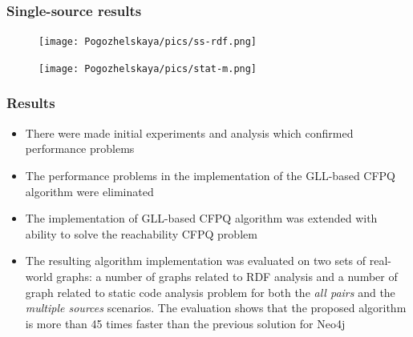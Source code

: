 \documentclass{beamer}
\begin{document}
\begin{frame} 
\transwipe[direction=90]
 \frametitle{Single-source results}
 \begin{figure}[H]
\centering
\texttt{[image: Pogozhelskaya/pics/ss-rdf.png]}
\label{fig:arch}
\end{figure}

\begin{figure}[H]
\centering
\texttt{[image: Pogozhelskaya/pics/stat-m.png]}
\label{fig:arch}
\end{figure}

\end{frame}

\begin{frame}
\transwipe[direction=90]
\frametitle{Results}
\begin{itemize}
     \item There were made initial experiments and analysis which confirmed performance problems
    \item The performance problems in the implementation of the GLL-based CFPQ algorithm were eliminated
    \item The implementation of GLL-based CFPQ algorithm was extended with ability to solve the reachability CFPQ problem
    \item The resulting algorithm implementation was evaluated on two sets of real-world graphs: a number of graphs related to RDF analysis and a number of graph related to static code analysis problem for both the \textit{all pairs} and the \textit{multiple sources} scenarios. The evaluation shows that the proposed algorithm is more than 45 times faster than the previous solution for Neo4j
    \end{itemize}
\end{frame}
\end{document}
